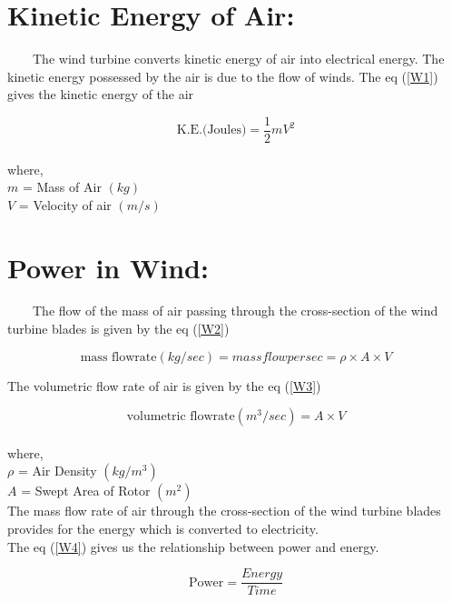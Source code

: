 
\section{Kinetic Energy of Air:}
\
\
\
\
The wind turbine converts kinetic energy of air into electrical energy. The kinetic energy possessed by the air is due to the flow of winds. The eq (\ref{W1}) gives the kinetic energy of the air

\begin{equation}
\label{W1}
\text{K.E.(Joules)}=\frac{1}{2}mV^2
\end{equation}\\
where,\\
$ m $ = Mass of Air $ (kg) $\\
$ V $ = Velocity of air $ (m/s) $\\


\section{Power in Wind:}
\
\
\
\
The flow of the mass of air passing through the cross-section of the wind turbine blades is given by the eq (\ref{W2})

\begin{equation}
\label{W2}
\text{mass flowrate} (kg/sec) = mass flow per sec = \rho\times A\times V
\end{equation}

The volumetric flow rate of air is given by the eq (\ref{W3})

\begin{equation}
\label{W3}
\text{volumetric flowrate} (m^3/sec) = A \times V
\end{equation}\\
where,\\
$ \rho $ = Air Density $ (kg/m^{3}) $\\
$ A $ = Swept Area of Rotor $ (m^{2}) $\\

The mass flow rate of air through the cross-section of the wind turbine blades provides for the energy which is converted to electricity.\\


The eq (\ref{W4}) gives us the relationship between power and energy.

\begin{equation}
\label{W4}
\text{Power} = \frac{Energy}{Time}
\end{equation}

